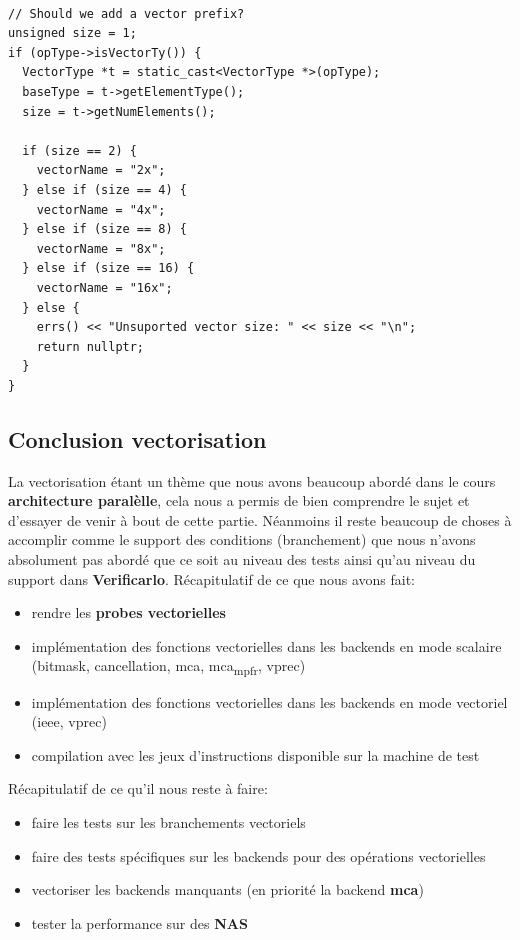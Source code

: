 \documentclass[11pt]{article}
\begin{document}
\begin{verbatim}

// Should we add a vector prefix?
unsigned size = 1;
if (opType->isVectorTy()) {
  VectorType *t = static_cast<VectorType *>(opType);
  baseType = t->getElementType();
  size = t->getNumElements();

  if (size == 2) {
    vectorName = "2x";
  } else if (size == 4) {
    vectorName = "4x";
  } else if (size == 8) {
    vectorName = "8x";
  } else if (size == 16) {
    vectorName = "16x";
  } else {
    errs() << "Unsuported vector size: " << size << "\n";
    return nullptr;
  }
}

\end{verbatim}

\subsection{Conclusion vectorisation}
\label{sec:org947b424}

La vectorisation étant un thème que nous avons beaucoup abordé dans le cours
\textbf{architecture paralèlle}, cela nous a permis de bien comprendre le sujet et
d'essayer de venir à bout de cette partie.
\vspace{5mm}
Néanmoins il reste beaucoup de choses à accomplir comme le support des
conditions (branchement) que nous n'avons absolument pas abordé que ce soit
au niveau des tests ainsi qu'au niveau du support dans \textbf{Verificarlo}.
\vspace{5mm}
Récapitulatif de ce que nous avons fait:
\begin{itemize}
\item rendre les \textbf{probes vectorielles}
\item implémentation des fonctions vectorielles dans les backends en mode
scalaire (bitmask, cancellation, mca, mca\textsubscript{mpfr}, vprec)
\item implémentation des fonctions vectorielles dans les backends en mode
vectoriel (ieee, vprec)
\item compilation avec les jeux d'instructions disponible sur la machine de test
\end{itemize}
\vspace{5mm}
Récapitulatif de ce qu'il nous reste à faire:
\begin{itemize}
\item faire les tests sur les branchements vectoriels
\item faire des tests spécifiques sur les backends pour des opérations
vectorielles
\item vectoriser les backends manquants (en priorité la backend \textbf{mca})
\item tester la performance sur des \textbf{NAS}
\end{itemize}
\end{document}
